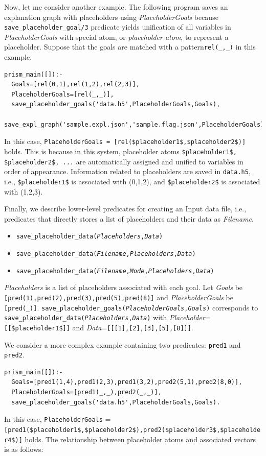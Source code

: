 \documentclass[a4paper]{report}
\begin{document}
Now, let me consider another example.
The following program saves an explanation graph with placeholders using {\it PlaceholderGoals}
because {\tt save\_placeholder\_goal/3} predicate yields unification of all variables in {\it PlaceholderGoals} with special atom, or {\it placeholder atom}, to represent a placeholder.
Suppose that the goals are matched with a pattern{\tt rel(\_,\_)} in this example.
\begin{verbatim}
prism_main([]):-
  Goals=[rel(0,1),rel(1,2),rel(2,3)],
  PlaceholderGoals=[rel(_,_)],
  save_placeholder_goals('data.h5',PlaceholderGoals,Goals),
  save_expl_graph('sample.expl.json','sample.flag.json',PlaceholderGoals).
\end{verbatim}

In this case, \verb|PlaceholderGoals = [rel($placeholder1$,$placeholder2$)]| holds.
This is because in this system, placeholder atoms \verb|$placeholder1$, $placeholder2$, ...| are automatically assigned and unified to variables in order of appearance.
Information related to placeholders are saved in {\tt data.h5}, i.e., 
\verb|$placeholder1$| is associated with (0,1,2), and \verb|$placeholder2$| is associated with (1,2,3).

Finally, we describe lower-level predicates for creating an Input data file, i.e.,
predicates that directly stores a list of placeholders and their data as {\it Filename}.
\begin{itemize}
	\item {\tt save\_placeholder\_data({\it Placeholders},{\it Data})}
	\item {\tt save\_placeholder\_data({\it Filename},{\it Placeholders},{\it Data})}
	\item {\tt save\_placeholder\_data({\it Filename},{\it Mode},{\it Placeholders},{\it Data})}
\end{itemize}

{\it Placeholders} is a list of placeholders associated with each goal.
Let {\it Goals} be \verb|[pred(1),pred(2),pred(3),pred(5),pred(8)]|
and {\it PlaceholderGoals} be \verb|[pred(_)]|.
{\tt save\_placeholder\_goals({\it PlaceholderGoals},{\it Goals})}
 corresponds to {\tt save\_placeholder\_data({\it Placeholders},{\it Data})} with
{\it Placeholder}={\tt [[\$placeholder1\$]]} and {\it Data}={\tt [[[1],[2],[3],[5],[8]]]}.

We consider a more complex example containing two predicates: {\tt pred1} and {\tt pred2}.
\begin{verbatim}
prism_main([]):-
  Goals=[pred1(1,4),pred1(2,3),pred1(3,2),pred2(5,1),pred2(8,0)],
  PlaceholderGoals=[pred1(_,_),pred2(_,_)],
  save_placeholder_goals('data.h5',PlaceholderGoals,Goals).
\end{verbatim}
In this case, \verb|PlaceholderGoals| = \verb|[pred1($placeholder1$,$placeholder2$),pred2($placeholder3$,$placeholder4$)]| holds.
The relationship between placeholder atoms and associated vectors is as follows:
\end{document}
